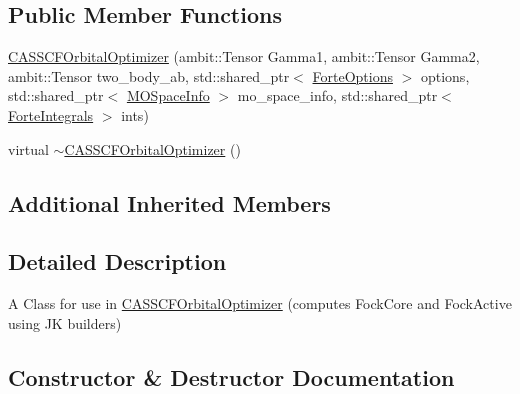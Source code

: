 \subsection*{Public Member Functions}
\begin{DoxyCompactItemize}
\item 
\mbox{\hyperlink{classforte_1_1_c_a_s_s_c_f_orbital_optimizer_a9172a146b982719e81df2ce4f96e00c3}{C\+A\+S\+S\+C\+F\+Orbital\+Optimizer}} (ambit\+::\+Tensor Gamma1, ambit\+::\+Tensor Gamma2, ambit\+::\+Tensor two\+\_\+body\+\_\+ab, std\+::shared\+\_\+ptr$<$ \mbox{\hyperlink{classforte_1_1_forte_options}{Forte\+Options}} $>$ options, std\+::shared\+\_\+ptr$<$ \mbox{\hyperlink{classforte_1_1_m_o_space_info}{M\+O\+Space\+Info}} $>$ mo\+\_\+space\+\_\+info, std\+::shared\+\_\+ptr$<$ \mbox{\hyperlink{classforte_1_1_forte_integrals}{Forte\+Integrals}} $>$ ints)
\item 
virtual \mbox{\hyperlink{classforte_1_1_c_a_s_s_c_f_orbital_optimizer_a54dd9f2b7d0549031d051a89d3a0d561}{$\sim$\+C\+A\+S\+S\+C\+F\+Orbital\+Optimizer}} ()
\end{DoxyCompactItemize}
\subsection*{Additional Inherited Members}


\subsection{Detailed Description}
A Class for use in \mbox{\hyperlink{classforte_1_1_c_a_s_s_c_f_orbital_optimizer}{C\+A\+S\+S\+C\+F\+Orbital\+Optimizer}} (computes Fock\+Core and Fock\+Active using JK builders) 

\subsection{Constructor \& Destructor Documentation}
\mbox{\label{classforte_1_1_c_a_s_s_c_f_orbital_optimizer_a9172a146b982719e81df2ce4f96e00c3}} 
